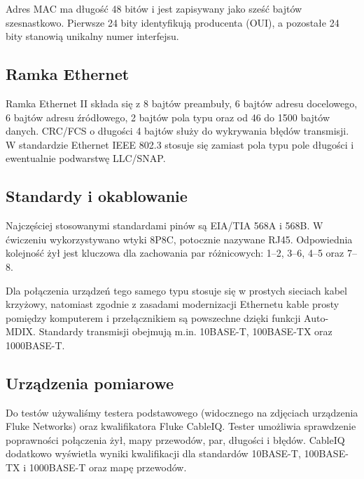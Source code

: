 \documentclass[12pt,a4paper]{article}
\begin{document}
Adres MAC ma długość 48 bitów i jest zapisywany jako sześć bajtów szesnastkowo. Pierwsze 24 bity identyfikują producenta (OUI), a pozostałe 24 bity stanowią unikalny numer interfejsu.

\subsection{Ramka Ethernet}
Ramka Ethernet II składa się z 8 bajtów preambuły, 6 bajtów adresu docelowego, 6 bajtów adresu źródłowego, 2 bajtów pola typu oraz od 46 do 1500 bajtów danych. CRC/FCS o długości 4 bajtów służy do wykrywania błędów transmisji. W standardzie Ethernet IEEE 802.3 stosuje się zamiast pola typu pole długości i ewentualnie podwarstwę LLC/SNAP.

\subsection{Standardy i okablowanie}
Najczęściej stosowanymi standardami pinów są EIA/TIA 568A i 568B. W ćwiczeniu wykorzystywano wtyki 8P8C, potocznie nazywane RJ45. Odpowiednia kolejność żył jest kluczowa dla zachowania par różnicowych: 1--2, 3--6, 4--5 oraz 7--8.

Dla połączenia urządzeń tego samego typu stosuje się w prostych sieciach kabel krzyżowy, natomiast zgodnie z zasadami modernizacji Ethernetu kable prosty pomiędzy komputerem i przełącznikiem są powszechne dzięki funkcji Auto-MDIX. Standardy transmisji obejmują m.in. 10BASE-T, 100BASE-TX oraz 1000BASE-T.

\subsection{Urządzenia pomiarowe}
Do testów używaliśmy testera podstawowego (widocznego na zdjęciach urządzenia Fluke Networks) oraz kwalifikatora Fluke CableIQ. Tester umożliwia sprawdzenie poprawności połączenia żył, mapy przewodów, par, długości i błędów. CableIQ dodatkowo wyświetla wyniki kwalifikacji dla standardów 10BASE-T, 100BASE-TX i 1000BASE-T oraz mapę przewodów.
\end{document}
